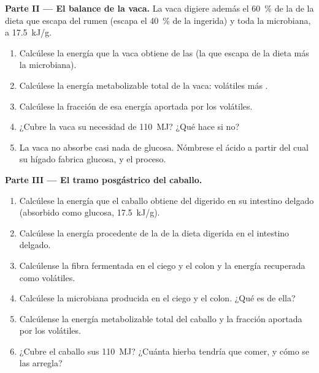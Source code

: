 \begin{problem}
\medskip
\noindent\textbf{Parte II --- El balance de la vaca.}
La vaca digiere además el \qty{60}{\%} de la  de la dieta que escapa
del rumen (escapa el \qty{40}{\%} de la  ingerida) y toda la
 microbiana, a \qty{17.5}{kJ/g}.
\begin{enumerate}[resume]
  \item Calcúlese la energía que la vaca obtiene de las  (la que
        escapa de la dieta más la microbiana).
  \item Calcúlese la energía metabolizable total de la vaca: 
        volátiles más .
  \item Calcúlese la fracción de esa energía aportada por los 
        volátiles.
  \item ¿Cubre la vaca su necesidad de \qty{110}{MJ}? ¿Qué hace si no?
  \item La vaca no absorbe casi nada de glucosa. Nómbrese el ácido a partir
        del cual su hígado fabrica glucosa, y el proceso.
\end{enumerate}

\medskip
\noindent\textbf{Parte III --- El tramo posgástrico del caballo.}
\begin{enumerate}[resume]
  \item Calcúlese la energía que el caballo obtiene del  digerido en
        su intestino delgado (absorbido como glucosa, \qty{17.5}{kJ/g}).
  \item Calcúlese la energía procedente de la  de la dieta digerida
        en el intestino delgado.
  \item Calcúlense la fibra fermentada en el ciego y el colon y la energía
        recuperada como  volátiles.
  \item Calcúlese la  microbiana producida en el ciego y el colon.
        ¿Qué es de ella?
  \item Calcúlense la energía metabolizable total del caballo y la fracción
        aportada por los  volátiles.
  \item ¿Cubre el caballo sus \qty{110}{MJ}? ¿Cuánta hierba tendría que
        comer, y cómo se las arregla?
\end{enumerate}


\end{problem}
